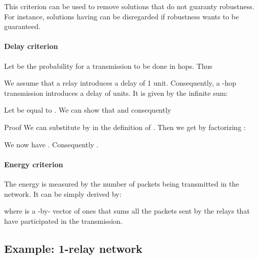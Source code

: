 \documentclass[a4paper]{article}
\begin{document}
{This criterion can be used to remove solutions that do not guaranty robustness. For instance, solutions having  can be disregarded if robustness wants to be guaranteed.

\paragraph{Delay criterion}
Let  be the probability for a transmission to be done in  hops. Thus 

We assume that a relay introduces a delay of 1 unit. Consequently, a -hop transmission introduces a delay of  units.  
It is given by the infinite sum: 

Let  be equal to . We can show that  and consequently
 
{\sc Proof}
We can substitute  by  in the definition of . Then we get by factorizing :

We now have . Consequently .

\hspace{4.2in}{\it q.e.d.}

\paragraph{Energy criterion}

The energy is measured by the number of packets being transmitted in the network. It can be simply derived by:


\noindent where  is a -by- vector of ones that sums all the packets sent by the relays that have participated in the transmission.

\subsection{Example: 1-relay network}

}
\end{document}
